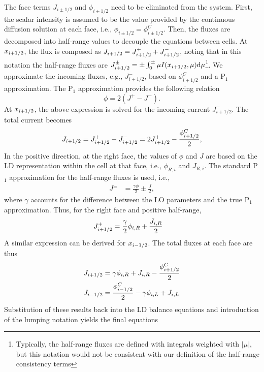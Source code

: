 The face terms $J_{i\pm 1/2}$ and $\phi_{i\pm 1/2}$ need to be eliminated from the
system. First, the scalar intensity is assumed to be the value provided by the continuous
diffusion solution at each face, i.e., $\phi_{i\pm1/2} = \phi_{i\pm1/2}^C$.
Then, the fluxes are decomposed into half-range values to decouple the equations
between cells.  At $x_{{i+1/2}}$, the flux is composed as $J_{i+1/2} = J_{{i+1/2}}^+ + J_{{i+1/2}}^-$,
noting that in this notation the half-range fluxes are $J_{{i+1/2}}^{\pm}=\pm \int_{0}^\pm
\mu I(x_{i+1/2},\mu) \mathrm{d} \mu$\footnote{Typically, the half-range fluxes are defined with
    integrals weighted with $| \mu |$, but this notation would not be consistent with our
definition of the half-range consistency terms}.  We approximate the incoming fluxes, e.g.,
$J_{i+1/2}^-$, based on $\phi_{i+1/2}^C$ and a P$_1$ approximation.   
The P$_1$ approximation provides the following relation~\cite{wla_thesis}
\begin{equation}
    \phi = 2(J^+ - J^-).
\end{equation}
At ${x_{i+1/2}}$, the above expression is solved for the incoming current $J_{i+1/2}^-$.  The
total current becomes
\begin{equation}\label{eq:jelim}
    J_{{i+1/2}} = J_{{i+1/2}}^+ - J_{{i+1/2}}^- = 2J_{{i+1/2}}^+ - \frac{\phi_{i+1/2}^C}{2},
\end{equation}
In the positive direction, at the right face, the
values of $\phi$ and $J$ are based on the LD representation within the cell at that
face, i.e., $\phi_{R,i}$ and $J_{R,i}$.  The standard P$_1$ approximation for the
half-range fluxes is used\cite{stacy}, i.e.,
\begin{align}
    J^{\pm} &= \frac{\gamma \phi}{2} \pm \frac{J}{2},
\end{align}
where $\gamma$ accounts for the difference between the LO parameters and the true
P$_1$ approximation. Thus, for the right face and positive half-range,
\begin{align}
    J_{{i+1/2}}^+ &= \frac{\gamma}{2}\phi_{i,R} + \frac{J_{i,R}}{2} 
\end{align}
A similar expression can be derived for ${x_{i-1/2}}$.  The total fluxes at each face are
thus
\begin{align}
    J_{i+1/2} &= \gamma\phi_{i,R} + J_{i,R} - \frac{\phi_{{i+1/2}}^C}{2} \\
    J_{i-1/2} &= \frac{\phi_{i-1/2}^C}{2} - \gamma \phi_{i,L} + J_{i,L}
\end{align}
Substitution of these results back into the LD balance equations and introduction of the
lumping notation yields the final equations 
